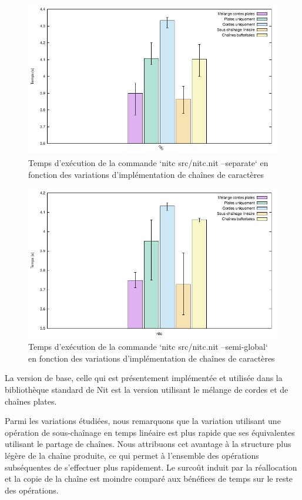 \begin{figure}
	\caption{Temps d'exécution de la commande `nitc src/nitc.nit --separate` en fonction des variations d'implémentation de chaînes de caractères}
	\label{nitc_sep}
	\centering
	\includegraphics[]{figures/nitc_separate_vars.pdf}
\end{figure}

\begin{figure}
	\caption{Temps d'exécution de la commande `nitc src/nitc.nit --semi-global` en fonction des variations d'implémentation de chaînes de caractères}
	\label{nitc_sg_vars}
	\centering
	\includegraphics[]{figures/nitc_semi-global_vars.pdf}
\end{figure}

La version de base, celle qui est présentement implémentée et utilisée dans la bibliothèque
standard de Nit est la version utilisant le mélange de cordes et de chaînes plates.

Parmi les variations étudiées, nous remarquons que la variation utilisant une opération de
sous-chaînage en temps linéaire est plus rapide que ses équivalentes utilisant le partage
de chaînes.
Nous attribuons cet avantage à la structure plus légère de la chaîne produite, ce qui permet
à l'ensemble des opérations subséquentes de s'effectuer plus rapidement.
Le surcoût induit par la réallocation et la copie de la chaîne est moindre comparé
aux bénéfices de temps sur le reste des opérations.

